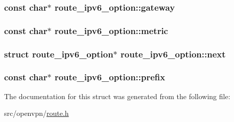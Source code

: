 \subsubsection[{gateway}]{\setlength{\rightskip}{0pt plus 5cm}const char$\ast$ route\+\_\+ipv6\+\_\+option\+::gateway}\label{structroute__ipv6__option_a87609a4d4046b809cb09a9589ad89342}
\hypertarget{structroute__ipv6__option_aafdd5f0107a4d79ce2117cea8b7aa25b}{}
\subsubsection[{metric}]{\setlength{\rightskip}{0pt plus 5cm}const char$\ast$ route\+\_\+ipv6\+\_\+option\+::metric}\label{structroute__ipv6__option_aafdd5f0107a4d79ce2117cea8b7aa25b}
\hypertarget{structroute__ipv6__option_a7ba8628e0b3c6d57eda197c9148b8023}{}
\subsubsection[{next}]{\setlength{\rightskip}{0pt plus 5cm}struct {\bf route\+\_\+ipv6\+\_\+option}$\ast$ route\+\_\+ipv6\+\_\+option\+::next}\label{structroute__ipv6__option_a7ba8628e0b3c6d57eda197c9148b8023}
\hypertarget{structroute__ipv6__option_ab79c4b88ea837357d62414c63e648965}{}
\subsubsection[{prefix}]{\setlength{\rightskip}{0pt plus 5cm}const char$\ast$ route\+\_\+ipv6\+\_\+option\+::prefix}\label{structroute__ipv6__option_ab79c4b88ea837357d62414c63e648965}


The documentation for this struct was generated from the following file\+:\begin{DoxyCompactItemize}
\item 
src/openvpn/\hyperlink{route_8h}{route.\+h}\end{DoxyCompactItemize}
